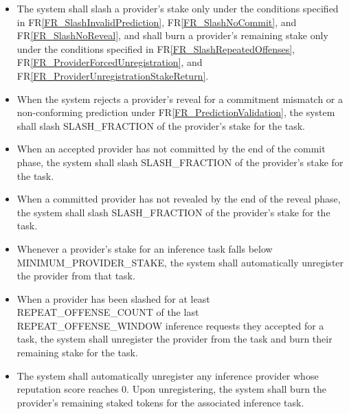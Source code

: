 \documentclass[12pt]{article}
\newcounter{reqnum} %
\newcommand{\rref}[1]{FR\ref{#1}}
\begin{document}
\noindent \begin{itemize}

\item[FR\refstepcounter{reqnum}\thereqnum \label{FR_InferenceProviderSlashing}:] The system shall slash a provider's stake only under the conditions specified in \rref{FR_SlashInvalidPrediction}, \rref{FR_SlashNoCommit}, and \rref{FR_SlashNoReveal}, and shall burn a provider's remaining stake only under the conditions specified in \rref{FR_SlashRepeatedOffenses}, \rref{FR_ProviderForcedUnregistration}, and \rref{FR_ProviderUnregistrationStakeReturn}.

\item[FR\refstepcounter{reqnum}\thereqnum \label{FR_SlashInvalidPrediction}:] When the system rejects a provider's reveal for a commitment mismatch or a non-conforming prediction under \rref{FR_PredictionValidation}, the system shall slash SLASH\_FRACTION of the provider's stake for the task.

\item[FR\refstepcounter{reqnum}\thereqnum \label{FR_SlashNoCommit}:] When an accepted provider has not committed by the end of the commit phase, the system shall slash SLASH\_FRACTION of the provider's stake for the task.

\item[FR\refstepcounter{reqnum}\thereqnum \label{FR_SlashNoReveal}:] When a committed provider has not revealed by the end of the reveal phase, the system shall slash SLASH\_FRACTION of the provider's stake for the task.

\item[FR\refstepcounter{reqnum}\thereqnum \label{FR_ProviderMinimumStakeUnregistration}:] Whenever a provider's stake for an inference task falls below MINIMUM\_PROVIDER\_STAKE, the system shall automatically unregister the provider from that task.

\item[FR\refstepcounter{reqnum}\thereqnum \label{FR_SlashRepeatedOffenses}:] When a provider has been slashed for at least REPEAT\_OFFENSE\_COUNT of the last REPEAT\_OFFENSE\_WINDOW inference requests they accepted for a task, the system shall unregister the provider from the task and burn their remaining stake for the task.

\item[FR\refstepcounter{reqnum}\thereqnum \label{FR_ProviderForcedUnregistration}:] The system shall automatically unregister any inference provider whose reputation score reaches $0$. Upon unregistering, the system shall burn the provider's remaining staked tokens for the associated inference task.


\end{itemize}
\end{document}
